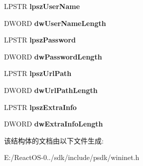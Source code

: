 \begin{DoxyCompactItemize}
L\+P\+S\+TR {\bfseries lpsz\+User\+Name}
\item 
\mbox{\label{struct_u_r_l___c_o_m_p_o_n_e_n_t_s_a_a6d535b94996fa28b93fd29742c8d5038}} 
D\+W\+O\+RD {\bfseries dw\+User\+Name\+Length}
\item 
\mbox{\label{struct_u_r_l___c_o_m_p_o_n_e_n_t_s_a_a9268b26bc9074496f0fab661955ca3b0}} 
L\+P\+S\+TR {\bfseries lpsz\+Password}
\item 
\mbox{\label{struct_u_r_l___c_o_m_p_o_n_e_n_t_s_a_a86b9e5056a1ab69b5daf5e38cfd8785a}} 
D\+W\+O\+RD {\bfseries dw\+Password\+Length}
\item 
\mbox{\label{struct_u_r_l___c_o_m_p_o_n_e_n_t_s_a_ad5632976c8ec9658b8e54683673123e3}} 
L\+P\+S\+TR {\bfseries lpsz\+Url\+Path}
\item 
\mbox{\label{struct_u_r_l___c_o_m_p_o_n_e_n_t_s_a_a4853acc9218745b92c85d43209c6593a}} 
D\+W\+O\+RD {\bfseries dw\+Url\+Path\+Length}
\item 
\mbox{\label{struct_u_r_l___c_o_m_p_o_n_e_n_t_s_a_a7c6eaa559a76b598a5ff7a2d6dd82e4d}} 
L\+P\+S\+TR {\bfseries lpsz\+Extra\+Info}
\item 
\mbox{\label{struct_u_r_l___c_o_m_p_o_n_e_n_t_s_a_a3f7c396bd2446bfec03bb3e19fd08f94}} 
D\+W\+O\+RD {\bfseries dw\+Extra\+Info\+Length}
\end{DoxyCompactItemize}


该结构体的文档由以下文件生成\+:\begin{DoxyCompactItemize}
\item 
E\+:/\+React\+O\+S-\/0../sdk/include/psdk/wininet.\+h\end{DoxyCompactItemize}
